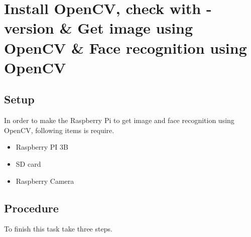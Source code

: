 \documentclass{article}
\begin{document}
\section{Install OpenCV, check with -version \& Get image using OpenCV \& Face recognition using OpenCV}
\subsection{Setup}
In order to make the Raspberry Pi to get image and face recognition using OpenCV, following items is require.
\begin{itemize}
	\item Raspberry PI 3B
	\item SD card
	\item Raspberry Camera
\end{itemize}
\subsection{Procedure}
To finish this task take three steps.
\end{document}
